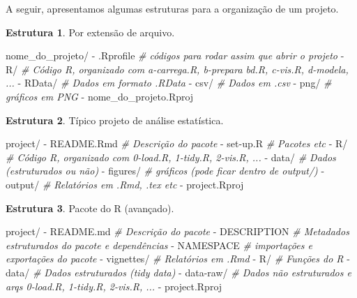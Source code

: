 \documentclass[
]{book}
\newenvironment{Shaded}{\begin{snugshade}}{\end{snugshade}}
\newcommand{\CommentTok}[1]{\textcolor[rgb]{0.56,0.35,0.01}{\textit{#1}}}
\newcommand{\ExtensionTok}[1]{#1}
\newcommand{\NormalTok}[1]{#1}
\begin{document}
A seguir, apresentamos algumas estruturas para a organização de um projeto.

\textbf{Estrutura 1}. Por extensão de arquivo.

\begin{Shaded}
\begin{Highlighting}[]
\ExtensionTok{nome\_do\_projeto/}
  \ExtensionTok{{-}}\NormalTok{ .Rprofile   }\CommentTok{\# códigos para rodar assim que abrir o projeto}
  \ExtensionTok{{-}}\NormalTok{ R/          }\CommentTok{\# Código R, organizado com a{-}carrega.R, b{-}prepara bd.R, c{-}vis.R, d{-}modela, ...}
  \ExtensionTok{{-}}\NormalTok{ RData/      }\CommentTok{\# Dados em formato .RData}
  \ExtensionTok{{-}}\NormalTok{ csv/        }\CommentTok{\# Dados em .csv}
  \ExtensionTok{{-}}\NormalTok{ png/        }\CommentTok{\# gráficos em PNG}
  \ExtensionTok{{-}}\NormalTok{ nome\_do\_projeto.Rproj}
\end{Highlighting}
\end{Shaded}

\textbf{Estrutura 2}. Típico projeto de análise estatística.

\begin{Shaded}
\begin{Highlighting}[]
\ExtensionTok{project/}
  \ExtensionTok{{-}}\NormalTok{ README.Rmd   }\CommentTok{\# Descrição do pacote}
  \ExtensionTok{{-}}\NormalTok{ set{-}up.R     }\CommentTok{\# Pacotes etc}
  \ExtensionTok{{-}}\NormalTok{ R/           }\CommentTok{\# Código R, organizado com 0{-}load.R, 1{-}tidy.R, 2{-}vis.R, ...}
  \ExtensionTok{{-}}\NormalTok{ data/        }\CommentTok{\# Dados (estruturados ou não)}
  \ExtensionTok{{-}}\NormalTok{ figures/     }\CommentTok{\# gráficos (pode ficar dentro de output/)}
  \ExtensionTok{{-}}\NormalTok{ output/      }\CommentTok{\# Relatórios em .Rmd, .tex etc}
  \ExtensionTok{{-}}\NormalTok{ project.Rproj}
\end{Highlighting}
\end{Shaded}

\textbf{Estrutura 3}. Pacote do R (avançado).

\begin{Shaded}
\begin{Highlighting}[]
\ExtensionTok{project/}
  \ExtensionTok{{-}}\NormalTok{ README.md    }\CommentTok{\# Descrição do pacote}
  \ExtensionTok{{-}}\NormalTok{ DESCRIPTION  }\CommentTok{\# Metadados estruturados do pacote e dependências}
  \ExtensionTok{{-}}\NormalTok{ NAMESPACE    }\CommentTok{\# importações e exportações do pacote}
  \ExtensionTok{{-}}\NormalTok{ vignettes/   }\CommentTok{\# Relatórios em .Rmd}
  \ExtensionTok{{-}}\NormalTok{ R/           }\CommentTok{\# Funções do R}
  \ExtensionTok{{-}}\NormalTok{ data/        }\CommentTok{\# Dados estruturados (tidy data)}
  \ExtensionTok{{-}}\NormalTok{ data{-}raw/    }\CommentTok{\# Dados não estruturados e arqs 0{-}load.R, 1{-}tidy.R, 2{-}vis.R, ...}
  \ExtensionTok{{-}}\NormalTok{ project.Rproj}
\end{Highlighting}
\end{Shaded}
\end{document}
